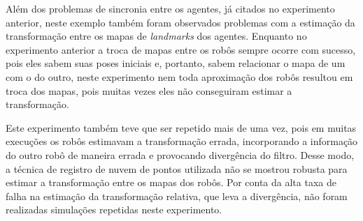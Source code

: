 Além dos problemas de sincronia entre os agentes, já citados no experimento 
anterior, neste exemplo também foram observados problemas com a estimação 
da transformação entre os mapas de \textit{landmarks} dos agentes. 
Enquanto no experimento anterior a troca de mapas entre os robôs sempre 
ocorre com sucesso, pois eles sabem suas poses iniciais e, portanto, sabem 
relacionar o mapa de um com o do outro, neste experimento nem toda aproximação dos 
robôs resultou em troca dos mapas, pois muitas vezes eles não conseguiram 
estimar a transformação.

Este experimento também teve que ser repetido mais de uma vez, pois em 
muitas execuções os robôs estimavam a transformação errada, incorporando 
a informação do outro robô de maneira errada e provocando divergência do 
filtro. Desse modo, a técnica de registro de nuvem de pontos utilizada 
não se mostrou robusta para estimar a transformação entre os mapas dos robôs. Por conta da alta taxa de falha na estimação da transformação 
relativa, que leva a divergência, não foram realizadas simulações 
repetidas neste experimento.

